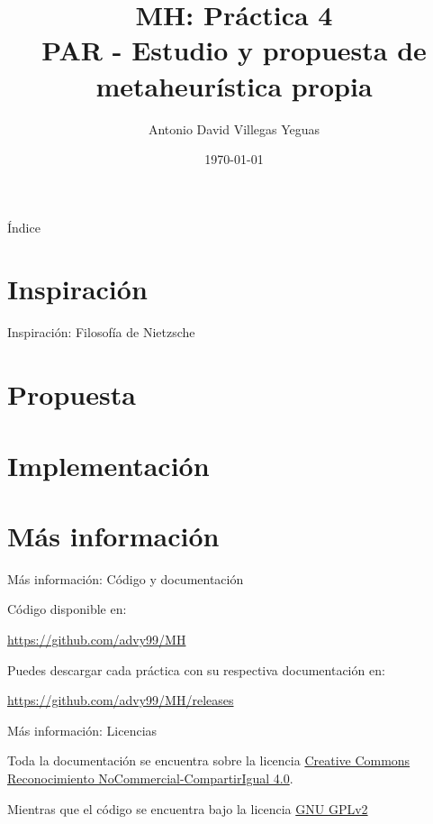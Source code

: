 \documentclass{beamer}
\title{MH: Práctica 4\\
			PAR - Estudio y propuesta de metaheurística propia}
\date{\today}
\author{Antonio David Villegas Yeguas}
\institute{Universidad de Granada\\
\medskip
\textit{advy99@correo.ugr.es}
}
\begin{document}
 \maketitle

\begin{frame}{Índice}
\tableofcontents
\end{frame}
  
  
\section{Inspiración}
\begin{frame}{Inspiración: Filosofía de Nietzsche}
    
\end{frame}
  
  
  
\section{Propuesta}
  
\section{Implementación}
  
\section{Más información}
  
\begin{frame}{Más información: Código y documentación}

	Código disponible en: 
	
	\begin{center}
		\url{https://github.com/advy99/MH}	
	\end{center}
	
	Puedes descargar cada práctica con su respectiva documentación en:
	
	\begin{center}
		\url{https://github.com/advy99/MH/releases}	
	\end{center}

	
\end{frame}	  
  
\begin{frame}{Más información: Licencias}
  
	Toda la documentación se encuentra sobre la licencia
 	\href{https://creativecommons.org/licenses/by-nc-sa/4.0/deed.es}{Creative Commons
	Reconocimiento NoCommercial-CompartirIgual 4.0}.

	\begin{center}\ccbyncsa\end{center}

	\vspace{1cm}

	Mientras que el código se encuentra bajo la licencia \href{https://www.gnu.org/licenses/old-licenses/gpl-2.0.html}{GNU GPLv2}
  
\end{frame}
\end{document}
